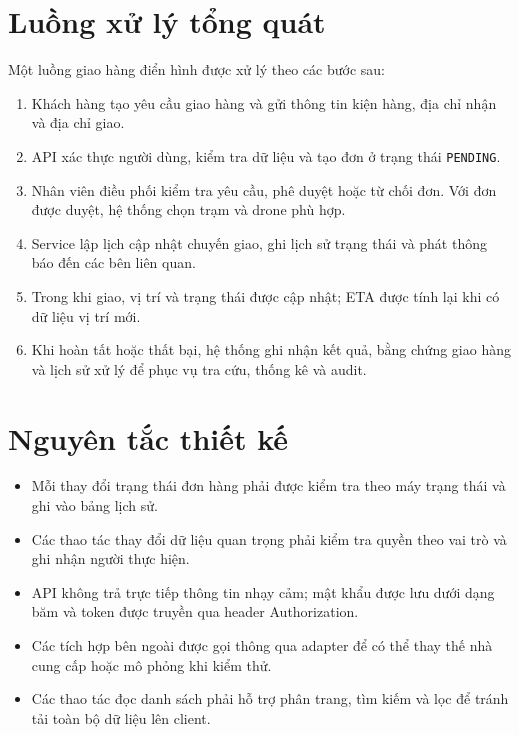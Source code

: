 \section{Luồng xử lý tổng quát}

Một luồng giao hàng điển hình được xử lý theo các bước sau:

\begin{enumerate}
	\item Khách hàng tạo yêu cầu giao hàng và gửi thông tin kiện hàng, địa chỉ nhận và địa chỉ giao.
	\item API xác thực người dùng, kiểm tra dữ liệu và tạo đơn ở trạng thái \texttt{PENDING}.
	\item Nhân viên điều phối kiểm tra yêu cầu, phê duyệt hoặc từ chối đơn. Với đơn được duyệt, hệ thống chọn trạm và drone phù hợp.
	\item Service lập lịch cập nhật chuyến giao, ghi lịch sử trạng thái và phát thông báo đến các bên liên quan.
	\item Trong khi giao, vị trí và trạng thái được cập nhật; ETA được tính lại khi có dữ liệu vị trí mới.
	\item Khi hoàn tất hoặc thất bại, hệ thống ghi nhận kết quả, bằng chứng giao hàng và lịch sử xử lý để phục vụ tra cứu, thống kê và audit.
\end{enumerate}

\section{Nguyên tắc thiết kế}

\begin{itemize}
	\item Mỗi thay đổi trạng thái đơn hàng phải được kiểm tra theo máy trạng thái và ghi vào bảng lịch sử.
	\item Các thao tác thay đổi dữ liệu quan trọng phải kiểm tra quyền theo vai trò và ghi nhận người thực hiện.
	\item API không trả trực tiếp thông tin nhạy cảm; mật khẩu được lưu dưới dạng băm và token được truyền qua header Authorization.
	\item Các tích hợp bên ngoài được gọi thông qua adapter để có thể thay thế nhà cung cấp hoặc mô phỏng khi kiểm thử.
	\item Các thao tác đọc danh sách phải hỗ trợ phân trang, tìm kiếm và lọc để tránh tải toàn bộ dữ liệu lên client.
\end{itemize}